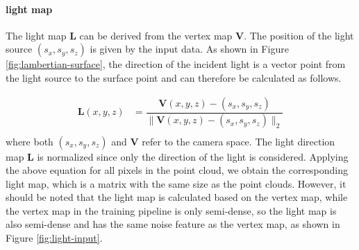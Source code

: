 \paragraph{light map}
The light map $ \textbf{L} $ can be derived from the vertex map $ \textbf{V} $. The position of the light source $ (s_x, s_y, s_z) $ is given by the input data. As shown in Figure \ref{fig:lambertian-surface}, the direction of the incident light is a vector point from the light source to the surface point and can therefore be calculated as follows.

\begin{equation}\label{light-direction}
	\begin{array}{ll}
		\textbf{L}(x,y,z)&= \dfrac{\textbf{V}(x,y,z)-(s_x,s_y, s_z)}{\|\textbf{V}(x,y,z)-(s_x,s_y, s_z)\|_2}\\ 
	\end{array}
\end{equation}
where both $ (s_x, s_y, s_z) $ and $ \textbf{V} $ refer to the camera space. The light direction map $ \textbf{L} $ is normalized since only the direction of the light is considered. Applying the above equation for all pixels in the point cloud, we obtain the corresponding light map, which is a matrix with the same size as the point clouds. However, it should be noted that the light map is calculated based on the vertex map, while the vertex map in the training pipeline is only semi-dense, so the light map is also semi-dense and has the same noise feature as the vertex map, as shown in Figure \ref{fig:light-input}. 


